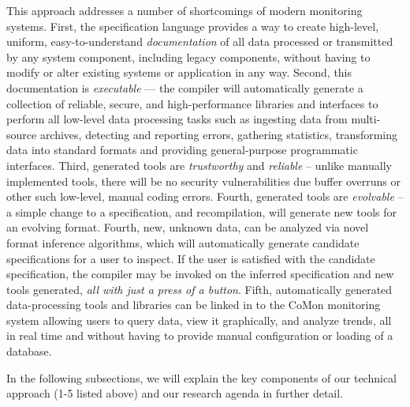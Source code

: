 

This approach addresses a number of shortcomings of modern monitoring
systems.  First, the \pads{} specification language provides a 
way to create high-level, uniform, easy-to-understand {\em documentation}
of all data processed or transmitted by any system component, 
including legacy components, without having to modify or alter existing
systems or
application in any way.  Second, this documentation is 
{\em executable} --- the
\pads{} compiler will automatically generate a collection of
reliable, secure, and high-performance libraries and interfaces
to perform all low-level data processing tasks such as ingesting
data from multi-source archives, detecting and reporting
errors, gathering statistics, 
transforming data into standard formats and providing
general-purpose programmatic interfaces.  Third, generated
tools are {\em trustworthy} and {\em reliable} -- unlike manually 
implemented tools, there will be no security vulnerabilities due
buffer overruns or other such low-level, manual coding errors.
Fourth, generated tools are {\em evolvable} -- a simple change to
a specification, and recompilation, will generate new tools for
an evolving format.  Fourth, new, unknown data, can be analyzed
via novel format inference algorithms, which will automatically generate
candidate specifications for a user to inspect.  If the user
is satisfied with the candidate specification, the \pads{} compiler
may be invoked on the inferred specification and new tools generated,
{\em all with just a press of a button}.
Fifth, automatically generated data-processing tools and libraries 
can be linked in to the CoMon monitoring
system allowing users to query
data, view it graphically, and analyze trends, all in real
time and without having
to provide manual configuration or loading of a database.

In the following subsections, we will explain the key components of
our technical approach (1-5 listed above) and our research agenda in 
further detail.
